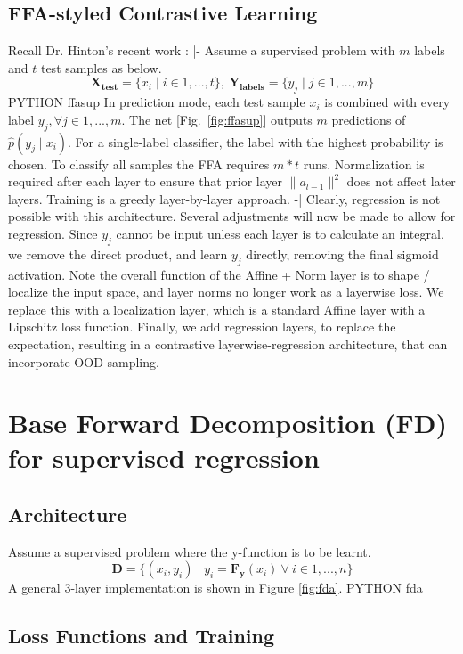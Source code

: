 \subsection{FFA-styled Contrastive Learning}
Recall Dr. Hinton's recent work \cite{FFA23}:
|-
Assume a supervised problem with $m$ labels and $t$ test samples as below.
\[
\mathbf{X_{test}} = \{x_i \mid i \in 1,...,t \},\ \mathbf{Y_{labels}} = \{y_j \mid j \in 1,...,m \}
\]
PYTHON ffasup
In prediction mode, each test sample $x_i$ is combined with every label $y_j, \forall j\in 1,...,m$. The net [Fig.~\ref{fig:ffasup}] outputs $m$ predictions of $\hat{p}(y_j \mid x_i)$.
For a single-label classifier, the label with the highest probability is chosen.
To classify all samples the FFA requires $m*t$ runs.
Normalization is required after each layer to ensure that prior layer $\|a_{l-1}\|^2$ does not affect later layers.
Training is a greedy layer-by-layer approach.
-|
Clearly, regression is not possible with this architecture. Several adjustments will now be made to allow for regression.
Since $y_j$ cannot be input unless each layer is to calculate an integral, we remove the direct product, and learn $y_j$ directly, removing the final sigmoid activation.
Note the overall function of the Affine + Norm layer is to shape / localize the input space, and layer norms no longer work as a layerwise loss. 
We replace this with a localization layer, which is a standard Affine layer with a Lipschitz loss function.
Finally, we add regression layers, to replace the expectation, resulting in a contrastive layerwise-regression architecture, that can incorporate OOD sampling.
\section{Base Forward Decomposition (FD) for supervised regression}
\subsection{Architecture}
Assume a supervised problem where the y-function is to be learnt.
\[
\mathbf{D} = \{(x_i,y_i) \mid y_i = \mathbf{F_y}(x_i)\:\forall\:i \in 1,...,n \}
\]
A general 3-layer implementation is shown in Figure \ref{fig:fda}.
PYTHON fda
\subsection{Loss Functions and Training}
